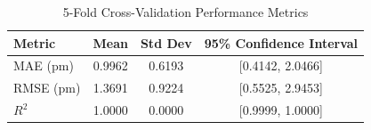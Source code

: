 \begin{table}[h]
\centering
\caption{5-Fold Cross-Validation Performance Metrics}
\label{tab:cross_validation}
\begin{tabular}{lccc}
\hline
\textbf{Metric} & \textbf{Mean} & \textbf{Std Dev} & \textbf{95\% Confidence Interval} \\ \hline
MAE (pm) & 0.9962 & 0.6193 & [0.4142, 2.0466] \\
RMSE (pm) & 1.3691 & 0.9224 & [0.5525, 2.9453] \\
$R^2$ & 1.0000 & 0.0000 & [0.9999, 1.0000] \\ \hline
\end{tabular}
\end{table}